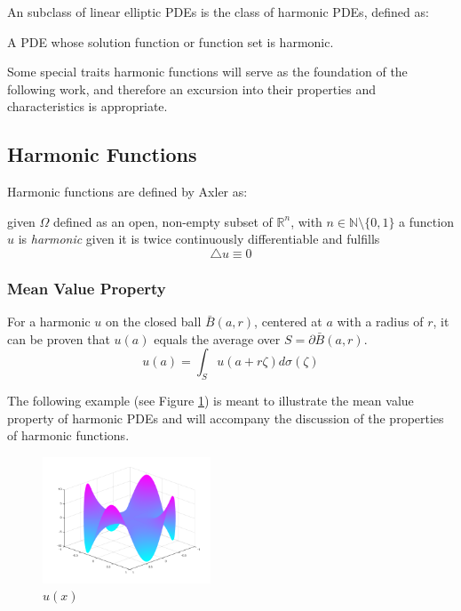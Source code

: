 An subclass of linear elliptic \Glspl{PDE} is the class of harmonic \Glspl{PDE}, defined as:
\begin{definition}
  A \Gls{PDE} whose solution function or function set is harmonic.
\end{definition}
Some special traits harmonic functions will serve as the foundation of the
 following work, and therefore an excursion into their properties and characteristics
is appropriate.

\subsection{Harmonic Functions}\label{sssec:harmonics}
Harmonic functions are defined by Axler as:
\begin{definition} given $\Omega$ defined as an open, non-empty subset of
  $\mathbb{R}^{n}$, with $n \in \mathbb{N}\setminus \{0,1\}$
  a function $u$ is \textit{harmonic} given it is twice continuously differentiable
  and fulfills $$ \bigtriangleup u \equiv 0$$
\end{definition}


  \subsubsection{Mean Value Property}\label{sssec:meanvalue}
  For a harmonic $u$ on the closed ball $\bar{B}(a,r)$, centered at $a$ with a radius of $r$,
  it can be proven that $u(a)$ equals the average over $S = \partial \bar{B}(a,r)$\cite{Axler1992,Bornemann}.
\begin{equation}
  \tag{Mean Value Property}
  u(a) = \int_{S} u(a + r\zeta)d\sigma(\zeta)
  \label{eq:mean}
\end{equation}

The following example (see Figure \ref{fig:swingPlot}) is meant to illustrate
the mean value property of harmonic \Glspl{PDE} and will accompany the discussion
of the properties of harmonic functions.

\begin{figure}[ht]
  \centering
  \includegraphics[width=5cm]{styles/swing_function_plot.png}
  \caption{$u(x)$}%
  \label{fig:swingPlot}
\end{figure}


